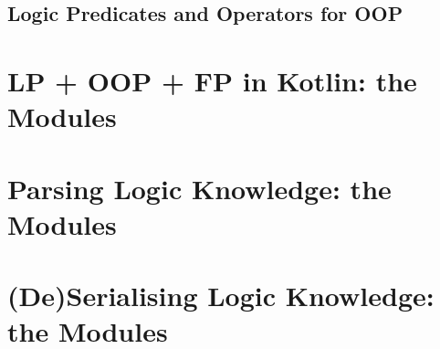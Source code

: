 \documentclass[presentation]{beamer}
\begin{document}
\subsection{Logic Predicates and Operators for OOP}

\section{LP + OOP + FP in Kotlin: the  Modules}

\section{Parsing Logic Knowledge: the  Modules}

\section{(De)Serialising Logic Knowledge: the  Modules}

\section*{}
\frame{\titlepage}

\section*{\bibname}


\begin{frame}\frametitle{\refname}
	\footnotesize
    
	
\end{frame}

\end{document}
